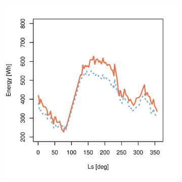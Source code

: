\begin{figure}[h]
\captionsetup[subfigure]{justification=centering}
\vspace{-2ex}
	\centering
    \setlength{\subfigureWidth}{0.32\textwidth}
    \setlength{\graphicsHeight}{50mm}
    \hypersetup{hidelinks=true}%
	\begin{subfigure}[t]{\subfigureWidth}
        \centering
		\includegraphics[height=\graphicsHeight]{sections/appendix/B/plots/predicted-vs-measured-energy-my29-adjusted.png}
		\label{fig:plot:sub:mer-energy-production-predicted-vs-reported-my29-adjusted}
	\end{subfigure}\hfill
	\begin{subfigure}[t]{\subfigureWidth}
        \centering

\end{subfigure}
\end{figure}
